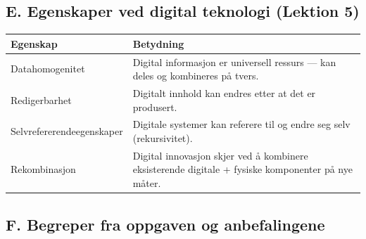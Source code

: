 \subsection*{E. Egenskaper ved digital teknologi (Lektion 5)}

\begin{tabular}{p{4cm}p{12cm}}
\hline
\textbf{Egenskap} & \textbf{Betydning} \\
\hline
Datahomogenitet & Digital informasjon er universell ressurs --- kan deles og
kombineres på tvers. \\
\hline
Redigerbarhet & Digitalt innhold kan endres etter at det er produsert. \\
\hline
Selvrefererende\newline egenskaper & Digitale systemer kan referere til og
endre seg selv (rekursivitet). \\
\hline
Rekombinasjon & Digital innovasjon skjer ved å kombinere eksisterende digitale
+ fysiske komponenter på nye måter. \\
\hline
\end{tabular}

\subsection*{F. Begreper fra oppgaven og anbefalingene}

